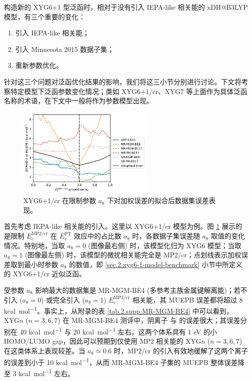 构造新的 XYG6+1 型泛函时，相对于没有引入 IEPA-like 相关能的 xDH@B3LYP 模型，有三个重要的变化：
\begin{enumerate}[nosep]
  \item 引入 IEPA-like 相关能；
  \item 引入 Minnesota 2015 数据子集；
  \item 重新参数优化。
\end{enumerate}
针对这三个问题对泛函优化结果的影响，我们将这三小节分别进行讨论。下文将考察特定模型下泛函参数变化情况；类如 XYG6+1/cr、XYG7 等上面作为具体泛函名称的术语，在下文中一般将作为参数模型出现。

\begin{figure}[h]
  \centering
  \includegraphics[width=0.6\textwidth]{assets/plot-seq-cr-proportion.pdf}
  \caption{XYG6+1/cr 在限制参数 $a_8$ 下对加权误差的拟合后数据集误差表现。}
  \label{fig.2.plot-seq-cr-proportion}
\end{figure}

首先考虑 IEPA-like 相关能的引入。这里以 XYG6+1/cr 模型为例。图 \ref{fig.2.plot-seq-cr-proportion} 展示的是限制 $E_\mathrm{c}^\text{MP2/cr}$ 在 $E_\mathrm{c}^\mathrm{PT}$ 效应中的占比数 $a_8$ 时，各数据子集误差随 $a_8$ 取值的变化情况。特别地，当取 $a_8 = 0$ (图像最右侧) 时，该模型化归为 XYG6 模型；当取 $a_8 = 1$ (图像最左侧) 时，该模型的微扰相关能完全是 MP2/cr；点划线表示加权误差取到最小时参数 $a_8$ 的数值，即 \ref{sec.2.xyg6-1-model-benchmark} 小节中所定义的 XYG6+1/cr 近似泛函。

受参数 $a_8$ 影响最大的数据集是 MR-MGM-BE4 (多参考主族金属键解离能)；若不引入 ($a_8 = 0$) 或完全引入 ($a_8 = 1$) $E_\mathrm{c}^\mathrm{MP2/cr}$ 相关能，其 MUEPB 误差都将超过 8 \si{kcal.mol^{-1}}。事实上，从附录的表 \ref{tab.2.supp.MR-MGM-BE4} 中可以看到，XYG$n$ ($n=3,6,7$) 在 MR-MGM-BE4 测评中，阴离子  与  的误差很大；其误差分别在 40 \si{kcal.mol^{-1}} 与 20 \si{kcal.mol^{-1}} 左右。这两个体系具有 1 eV 的小 HOMO/LUMO gap，因此可以预期到仅使用 MP2 相关能的 XYG$n$ ($n=3,6,7$) 在这类体系上表现较差。当 $a_8 \simeq 0.6$ 时，MP2/cr 的引入有效地缓解了这两个离子的误差到小于 10 \si{kcal.mol^{-1}}，从而 MR-MGM-BE4 子集的 MUEPB 整体误差降至 3 \si{kcal.mol^{-1}} 左右。

